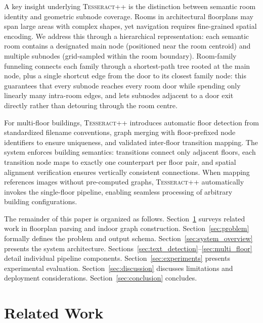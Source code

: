 \documentclass[manuscript,screen,review]{acmart}
\newcommand{\tesseract}{\textsc{Tesseract++}}
\begin{document}
A key insight underlying \tesseract{} is the distinction between semantic room identity and geometric subnode coverage. Rooms in architectural floorplans may span large areas with complex shapes, yet navigation requires fine-grained spatial encoding. We address this through a hierarchical representation: each semantic room contains a designated main node (positioned near the room centroid) and multiple subnodes (grid-sampled within the room boundary). Room-family funneling connects each family through a shortest-path tree rooted at the main node, plus a single shortcut edge from the door to its closest family node: this guarantees that every subnode reaches every room door while spending only linearly many intra-room edges, and lets subnodes adjacent to a door exit directly rather than detouring through the room centre.

For multi-floor buildings, \tesseract{} introduces automatic floor detection from standardized filename conventions, graph merging with floor-prefixed node identifiers to ensure uniqueness, and validated inter-floor transition mapping. The system enforces building semantics: transitions connect only adjacent floors, each transition node maps to exactly one counterpart per floor pair, and spatial alignment verification ensures vertically consistent connections. When mapping references images without pre-computed graphs, \tesseract{} automatically invokes the single-floor pipeline, enabling seamless processing of arbitrary building configurations.

The remainder of this paper is organized as follows. Section~\ref{sec:related_work} surveys related work in floorplan parsing and indoor graph construction. Section~\ref{sec:problem} formally defines the problem and output schema. Section~\ref{sec:system_overview} presents the system architecture. Sections~\ref{sec:text_detection}--\ref{sec:multi_floor} detail individual pipeline components. Section~\ref{sec:experiments} presents experimental evaluation. Section~\ref{sec:discussion} discusses limitations and deployment considerations. Section~\ref{sec:conclusion} concludes.

\section{Related Work}
\label{sec:related_work}
\end{document}

